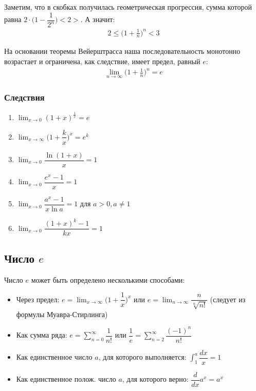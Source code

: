 \documentclass[a4paper,12pt]{extbook}
\theoremstyle{named}
\theoremstyle{named}
\begin{document}
Заметим, что в скобках получилась геометрическая прогрессия, сумма которой равна \(2 \cdot \Big(1 - \dfrac{1}{2^n}\Big) < 2>\). А значит:
\begin{gather*}
    2 \leq \Big(1 + \frac{1}{n}\Big)^n < 3
\end{gather*}

На основании теоремы Вейерштрасса наша последовательность монотонно возрастает и ограничена, как следствие, имеет предел, равный \(e\):
\begin{gather*}
    \lim_{n \to \infty}{\Big(1 + \frac{1}{n}\Big)^n} = e
\end{gather*}


\subsubsection*{Следствия}
\begin{enumerate}
    \item {\(\displaystyle{\lim_{x \to 0}{(1 + x)^{\frac{1}{x}}} = e}\)}
    \item {\(\displaystyle{\lim_{x \to \infty}{\Big(1 + \dfrac{k}{x}\Big)^x} = e^k}\)}
    \item {\(\displaystyle{\lim_{x \to 0}{\dfrac{\ln{(1 + x)}}{x}} = 1}\)}
    \item {\(\displaystyle{\lim_{x \to 0}{\dfrac{e^x - 1}{x}} = 1}\)}
    \item {\(\displaystyle{\lim_{x \to 0}{\dfrac{a^x - 1}{x\ln{a}} = 1}}\) для \(a > 0, a \neq 1\)}
    \item {\(\displaystyle{\lim_{x \to 0}{\dfrac{(1 + x)^k - 1}{kx}} = 1}\)}
\end{enumerate}

\subsection*{Число \(e\)}
Число \(e\) может быть определено несколькими способами:
\begin{itemize}
    \item {Через предел: \(e = \lim_{x \to \infty}{\Big(1 + \dfrac{1}{x}\Big)^x}\) или \(e = \lim_{n \to \infty}{\dfrac{n}{\sqrt[n]{n!}}}\) (следует из формулы Муавра-Стирлинга)}

    \item {Как сумма ряда: \(e = \displaystyle{\sum_{n = 0}^{\infty}{\dfrac{1}{n!}}}\) или \(\dfrac{1}{e} = \displaystyle{\sum_{n = 2}^{\infty}{\dfrac{(-1)^n}{n!}}}\) }

    \item {Как единственное число \(a\), для которого выполняется: \(\displaystyle{\int_{1}^{a}{\dfrac{dx}{x}} = 1}\)}

    \item {Как единственное полож. число \(a\), для которого верно: \(\dfrac{d}{dx}a^x = a^x\)}
\end{itemize}
\end{document}

